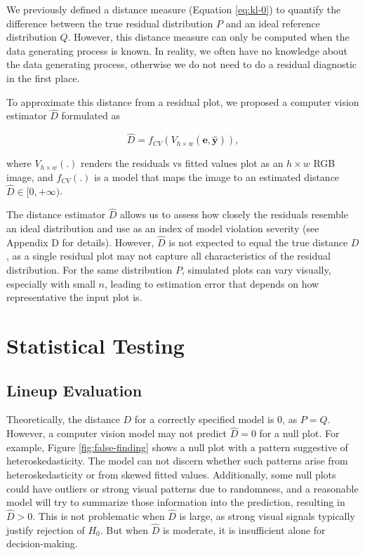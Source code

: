 \documentclass[]{interact}
\theoremstyle{plain}%
\theoremstyle{definition}
\theoremstyle{remark}
\begin{document}
We previously defined a distance measure (Equation \ref{eq:kl-0}) to
quantify the difference between the true residual distribution \(P\) and
an ideal reference distribution \(Q\). However, this distance measure
can only be computed when the data generating process is known. In
reality, we often have no knowledge about the data generating process,
otherwise we do not need to do a residual diagnostic in the first place.

To approximate this distance from a residual plot, we proposed a
computer vision estimator \(\hat{D}\) formulated as

\begin{equation} \label{eq:d-approx}
\hat{D} = f_{CV}(V_{h \times w}(\boldsymbol{e}, \hat{\boldsymbol{y}})),
\end{equation}

\noindent where \(V_{h \times w}(.)\) renders the residuals vs fitted
values plot as an \(h \times w\) RGB image, and \(f_{CV}(.)\) is a model
that maps the image to an estimated distance
\(\hat{D} \in [0, +\infty)\).

The distance estimator \(\hat{D}\) allows us to assess how closely the
residuals resemble an ideal distribution and use as an index of model
violation severity (see Appendix D for details). However, \(\hat{D}\) is
not expected to equal the true distance \(D\), as a single residual plot
may not capture all characteristics of the residual distribution. For
the same distribution \(P\), simulated plots can vary visually,
especially with small \(n\), leading to estimation error that depends on
how representative the input plot is.

\section{Statistical Testing}\label{sec-model-statistical-testing}

\subsection{Lineup Evaluation}\label{sec-model-lineup-evaluation}

Theoretically, the distance \(D\) for a correctly specified model is
\(0\), as \(P = Q\). However, a computer vision model may not predict
\(\hat{D} = 0\) for a null plot. For example, Figure
\ref{fig:false-finding} shows a null plot with a pattern suggestive of
heteroskedasticity. The model can not discern whether such patterns
arise from heteroskedasticity or from skewed fitted values.
Additionally, some null plots could have outliers or strong visual
patterns due to randomness, and a reasonable model will try to summarize
those information into the prediction, resulting in \(\hat{D} > 0\).
This is not problematic when \(\hat{D}\) is large, as strong visual
signals typically justify rejection of \(H_0\). But when \(\hat{D}\) is
moderate, it is insufficient alone for decision-making.
\end{document}
